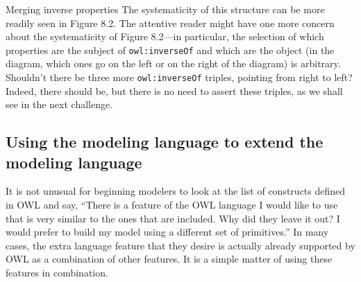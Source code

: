 \begin{challenge}{Merging inverse properties}
The systematicity of this structure can be more readily seen in Figure
8.2. The attentive reader might have one more concern about the
systematicity of Figure 8.2---in particular, the selection of which
properties are the subject of \texttt{owl:inverseOf} and which are the object (in
the diagram, which ones go on the left or on the right of the diagram)
is arbitrary. Shouldn't there be three more \texttt{owl:inverseOf} triples,
pointing from right to left? Indeed, there should be, but there is no
need to assert these triples, as we shall see in the next challenge.
\end{challenge}


\subsection{Using the modeling language to extend the modeling language}

It is not unusual for beginning modelers to look at the list of
constructs defined in OWL and say, ``There is a feature of the OWL
language I would like to use that is very similar to the ones that are
included. Why did they leave it out? I would prefer to build my model
using a different set of primitives.'' In many cases, the extra language
feature that they desire is actually already supported by OWL as a
combination of other features. It is a simple matter of using these
features in combination.

